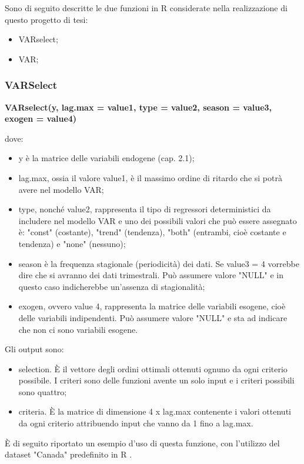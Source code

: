 \documentclass[12pt,a4paper,oneside,openright]{book}
\begin{document}
Sono di seguito descritte le due funzioni in R considerate nella realizzazione di questo progetto di tesi:
\begin{itemize}
\item VARselect;
\item VAR;
\end{itemize}
\newpage
\subsubsection{VARSelect}
\begin{center}
{\bfseries 
VARselect(y, lag.max = value1, type = value2, season = value3, exogen = value4)
}
\end{center}
dove:
\begin{itemize}
\item y è la matrice delle variabili endogene (cap. 2.1);
\item lag.max, ossia il valore value1, è il massimo ordine di ritardo che si potrà avere nel modello VAR;
\item type, nonché value2, rappresenta il tipo di regressori deterministici da includere nel modello VAR e uno dei possibili valori che può essere assegnato è: "const" (costante), "trend" (tendenza), "both" (entrambi, cioè costante e tendenza) e "none" (nessuno);
\item season è la frequenza stagionale (periodicità) dei dati. Se value3 = 4 vorrebbe dire che si avranno dei dati trimestrali. Può assumere valore "NULL" e in questo caso indicherebbe un'assenza di stagionalità;
\item exogen, ovvero value 4, rappresenta la matrice delle variabili esogene, cioè delle variabili indipendenti. Può assumere valore "NULL" e sta ad indicare che non ci sono variabili esogene.
\end{itemize}

Gli output sono:
\begin{itemize}
\item selection. È il vettore degli ordini ottimali ottenuti ognuno da ogni criterio possibile. I criteri sono delle funzioni avente un solo input e i criteri possibili sono quattro;
\item criteria. È la matrice di dimensione 4 x lag.max contenente i valori ottenuti da ogni criterio attribuendo input che vanno da 1 fino a lag.max.
\end{itemize}
\newpage
È di seguito riportato un esempio d'uso di questa funzione, con l'utilizzo del dataset "Canada" predefinito in R \cite{20a}.
\end{document}
